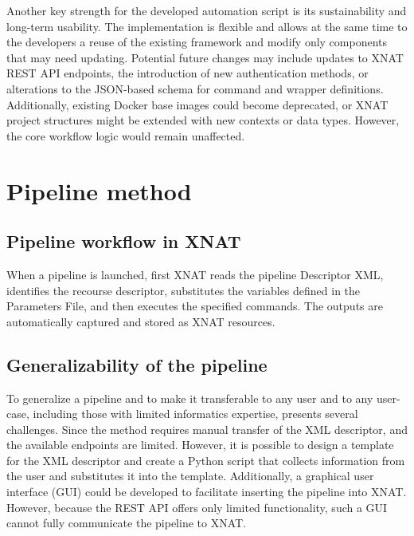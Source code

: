 Another key strength for the developed automation script is its sustainability and long-term usability. The implementation is flexible and allows at the same time to the developers a reuse of the existing framework and modify only components that may need updating. Potential future changes may include updates to XNAT REST API endpoints, the introduction of new authentication methods, or alterations to the JSON-based schema for command and wrapper definitions. Additionally, existing Docker base images could become deprecated, or XNAT project structures might be extended with new contexts or data types. However, the core workflow logic would remain unaffected.

\section{Pipeline method}
\subsection{Pipeline workflow in XNAT}
When a pipeline is launched, first XNAT reads the pipeline Descriptor XML, identifies the recourse descriptor, substitutes the variables defined in the Parameters File, and then executes the specified commands. The outputs are automatically captured and stored as XNAT resources.

\subsection{Generalizability of the pipeline}
\normalsize
To generalize a pipeline and to make it transferable to any user and to any user-case, including those with limited informatics expertise, presents several challenges.
Since the method requires manual transfer of the XML descriptor,  and the available endpoints are limited. 
However, it is possible to design a template for the XML descriptor and create a Python script that collects information from the user and substitutes it into the template. Additionally, a graphical user interface (GUI) could be developed to facilitate inserting the pipeline into XNAT. However, because the REST API offers only limited functionality, such a GUI cannot fully communicate the pipeline to XNAT.






